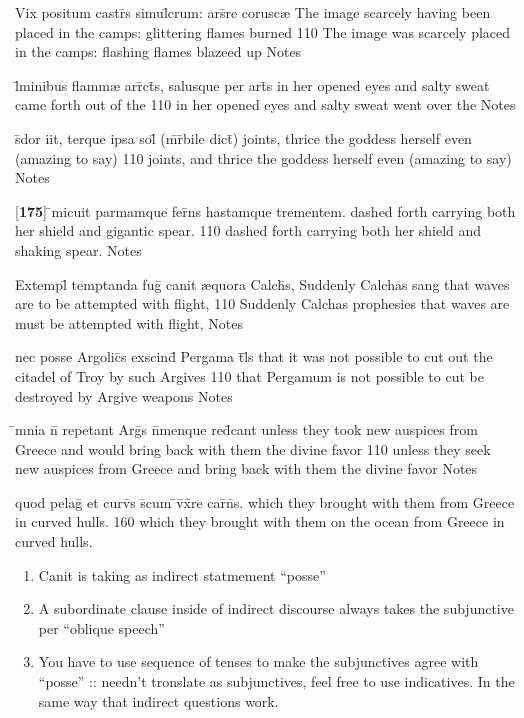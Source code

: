 \latline
  {Vix positum castr\={\macron {\i}}s simul\={}crum: ars\={}re corusc{\ae}}
  { The image scarcely having been placed in the camps: glittering flames burned }                 
  {110}
  { The image was scarcely  placed in the camps: flashing flames blazeed up  }
  { Notes }


\latline
  {l\={}minibus flamm{\ae} arr\={}ct\={\macron {\i}}s, salusque per art\={}s}       
  { in her opened eyes and salty sweat came forth out of the }           
  {110}
  { in her opened eyes and salty sweat went over the }
  { Notes }


\latline
  {s\={}dor iit, terque ipsa sol\={} (m\={\macron {\i}}r\={}bile dict\={})}
  { joints, thrice the goddess herself even (amazing to say) }         
  {110}
 { joints, and thrice the goddess herself even (amazing to say) }
  { Notes }


\latline
  {[\textbf{175}] \={}micuit parmamque fer\={}ns hastamque trementem.}
  { dashed forth carrying both her shield and gigantic spear. }
  {110}
  { dashed forth carrying both her shield and shaking spear. }
  { Notes }


\latline
  {Extempl\={} temptanda fug\={} canit {\ae}quora Calch\={}s,}
  { Suddenly Calchas sang that waves are to be attempted with flight, }      
  {110}
  { Suddenly Calchas prophesies that waves are must be attempted with flight, }
  { Notes }


\latline
  {nec posse Argolic\={\macron {\i}}s exscind\={\macron {\i}} Pergama t\={}l\={\macron {\i}}s}
  { that it was not possible to cut out the citadel of Troy by such Argives }
  {110}
  { that Pergamum is not possible to cut be destroyed by Argive weapons }
  { Notes }


\latline
  {\={}mnia n\={\macron {\i}} repetant Arg\={\macron {\i}}s n\={}menque red\={}cant}
  { unless they took new auspices from Greece and would bring back with them the divine favor }
  {110}
  { unless they seek new auspices from Greece and  bring back with them the divine favor }
  { Notes }


\latline
  {quod pelag\={} et curv\={\macron {\i}}s s\={}cum \={}v\={}x\={}re car\={\macron {\i}}n\={\macron {\i}}s.}
  { which they brought with them from Greece in curved hulls. }       
  {160}
  { which they brought with them on the ocean from Greece in curved hulls. } 
  { \begin{enumerate}
  	\item Canit is taking as indirect statmement ``posse''
    \item A subordinate clause inside of indirect discourse always takes the subjunctive per ``oblique speech''
    \item You have to use sequence of tenses to make the subjunctives agree with ``posse'' :: needn't tronslate as
subjunctives, feel free to use indicatives.  In the same way that indirect questions work.
  \end{enumerate} }


